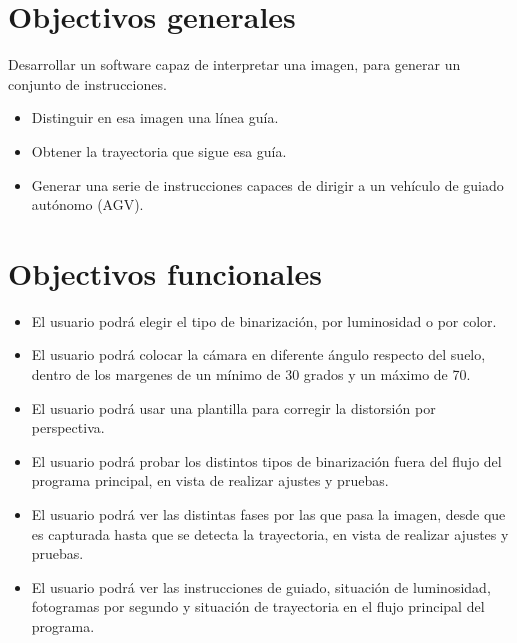 
\section{Objectivos generales}
Desarrollar un software capaz de interpretar una imagen, para generar un conjunto de instrucciones.

\begin{itemize}
	\item Distinguir en esa imagen una línea guía.
	
	\item Obtener la trayectoria que sigue esa guía.
	
	\item Generar una serie de instrucciones capaces de dirigir a un vehículo de guiado autónomo (AGV).
\end{itemize} 

\section{Objectivos funcionales}
\begin{itemize}
	\item El usuario podrá elegir el tipo de binarización, por luminosidad o por color.
	
	\item El usuario podrá colocar la cámara en diferente ángulo respecto del suelo, dentro de los margenes de un mínimo de 30 grados y un máximo de 70.
	
	\item El usuario podrá usar una plantilla para corregir la distorsión por perspectiva.
	
	\item El usuario podrá probar los distintos tipos de binarización fuera del flujo del programa principal, en vista de realizar ajustes y pruebas.
	
	\item El usuario podrá ver las distintas fases por las que pasa la imagen, desde que es capturada hasta que se detecta la trayectoria, en vista de realizar ajustes y pruebas.
	
	\item El usuario podrá ver las instrucciones de guiado, situación de luminosidad, fotogramas por segundo y situación de trayectoria en el flujo principal del programa.
	
\end{itemize}


